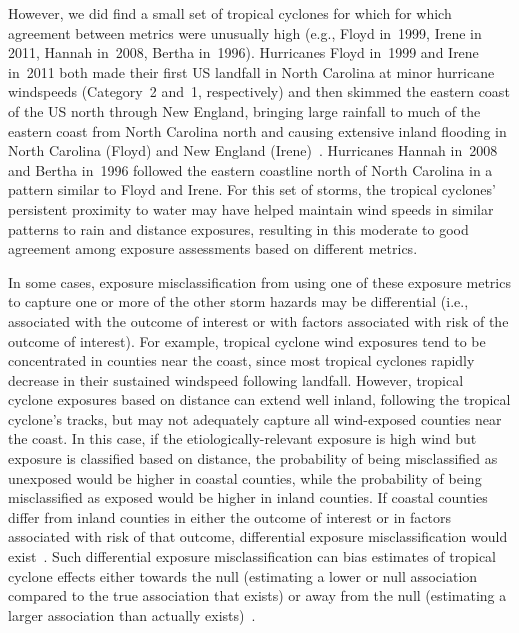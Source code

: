 However, we did find a small set of tropical cyclones for which for which
agreement between metrics were unusually high (e.g., Floyd in~1999, Irene in
2011, Hannah in~2008, Bertha in~1996).  Hurricanes Floyd in~1999 and Irene
in~2011 both made their first \ac{US} landfall in North Carolina at minor
hurricane windspeeds (Category~2 and~1, respectively) and then skimmed the
eastern coast of the \ac{US} north through New England, bringing large rainfall
to much of the eastern coast from North Carolina north and causing extensive
inland flooding in North Carolina (Floyd) and New England
(Irene)~\parencite{avila2013atlantic, lawrence2000atlantic}.  Hurricanes Hannah
in~2008 and Bertha in~1996 followed the eastern coastline north of North
Carolina in a pattern similar to Floyd and Irene. For this set of storms, the
tropical cyclones' persistent proximity to water may have helped maintain wind
speeds in similar patterns to rain and distance exposures, resulting in this
moderate to good agreement among exposure assessments based on different
metrics. 

In some cases, exposure misclassification from using one of these exposure
metrics to capture one or more of the other storm hazards may be differential
(i.e., associated with the outcome of interest or with factors associated with
risk of the outcome of interest). For example, tropical cyclone wind exposures
tend to be concentrated in counties near the coast, since most tropical
cyclones rapidly decrease in their sustained windspeed following landfall.
However, tropical cyclone exposures based on distance can extend well inland,
following the tropical cyclone's tracks, but may not adequately capture all
wind-exposed counties near the coast. In this case, if the
etiologically-relevant exposure is high wind but exposure is classified based
on distance, the probability of being misclassified as unexposed would be
higher in coastal counties, while the probability of being misclassified as
exposed would be higher in inland counties. If coastal counties differ from
inland counties in either the outcome of interest or in factors associated with
risk of that outcome, differential exposure misclassification would
exist~\parencite{savitz2016interpreting}. Such differential exposure
misclassification can bias estimates of tropical cyclone effects either towards
the null (estimating a lower or null association compared to the true
association that exists) or away from the null (estimating a larger association
than actually exists)~\parencite{savitz2016interpreting, armstrong1998effect}.

